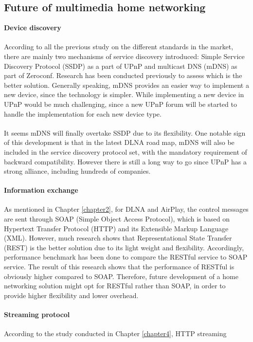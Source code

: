 \subsection{Future of multimedia home networking\label{5_3}}
\textbf{Device discovery}\\
\\
According to all the previous study on the different standards in the market,
there are mainly two mechanisms of service discovery introduced: Simple Service
Discovery Protocol (SSDP) as a part of UPnP and multicast DNS (mDNS) as part of
Zeroconf. Research \cite{zeroconf_vs_upnp} has been conducted previously to
assess which is the better solution. Generally speaking, mDNS provides an
easier way to implement a new device, since the technology is simpler. While
implementing a new device in UPnP would be much challenging, since a new UPnP
forum will be started to handle the implementation for each new device type.\\
\\
It seems mDNS will finally overtake SSDP due to its flexibility. One notable
sign of this development is that in the latest DLNA road map, mDNS will also be
included in the service discovery protocol set, with the mandatory requirement
of backward compatibility. However there is still a long way to go since UPnP
has a strong alliance, including hundreds of companies.\\
\\
\textbf{Information exchange}\\
\\
As mentioned in Chapter \ref{chapter2}, for DLNA and AirPlay, the control
messages are sent through SOAP (Simple Object Access Protocol), which is based on
Hypertext Transfer Protocol (HTTP) and its Extensible Markup Language (XML).
However, much research \cite{restful_webservice} shows that Representational
State Transfer (REST) is the better solution due to its light weight and
flexibility. Accordingly, performance benchmark \cite{performance_restful_saop}
has been done to compare the RESTful service to SOAP service. The result of this
research shows that the performance of RESTful is obviously higher compared to
SOAP. Therefore, future development of a home networking solution might opt for
RESTful rather than SOAP, in order to provide higher flexibility and lower
overhead.\\
\\
\textbf{Streaming protocol}\\
\\
According to the study conducted in Chapter \ref{chapter4}, HTTP streaming

